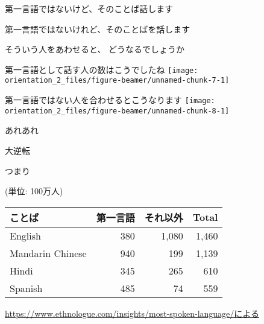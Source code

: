 \documentclass[
  ignorenonframetext,
  aspectratio=169,
  xcolor=dvipsnames]{beamer}
\begin{document}
\begin{frame}{第一言語ではないけど、そのことば話します}
\label{ux7b2cux4e00ux8a00ux8a9eux3067ux306fux306aux3044ux3051ux3069ux305dux306eux3053ux3068ux3070ux8a71ux3057ux307eux3059}
\Large

第一言語ではないけれど、そのことばを話します

そういう人をあわせると、 どうなるでしょうか
\end{frame}

\begin{frame}{第一言語として話す人の数はこうでしたね}
\label{ux7b2cux4e00ux8a00ux8a9eux3068ux3057ux3066ux8a71ux3059ux4ebaux306eux6570ux306fux3053ux3046ux3067ux3057ux305fux306d}
\texttt{[image: orientation\_2\_files/figure-beamer/unnamed-chunk-7-1]}
\end{frame}

\begin{frame}{第一言語ではない人を合わせるとこうなります}
\label{ux7b2cux4e00ux8a00ux8a9eux3067ux306fux306aux3044ux4ebaux3092ux5408ux308fux305bux308bux3068ux3053ux3046ux306aux308aux307eux3059}
\texttt{[image: orientation\_2\_files/figure-beamer/unnamed-chunk-8-1]}
\end{frame}

\begin{frame}{あれあれ}
\label{ux3042ux308cux3042ux308c}
\Huge

大逆転
\end{frame}

\begin{frame}{つまり}
\label{ux3064ux307eux308a}
\raggedleft

(単位: 100万人)

\vfill

\Large

\begin{tabular}{lrrr}
\toprule
ことば & 第一言語 & それ以外 & Total\\
\midrule
English & 380 & 1,080 & 1,460\\
Mandarin Chinese & 940 & 199 & 1,139\\
Hindi & 345 & 265 & 610\\
Spanish & 485 & 74 & 559\\
\bottomrule
\end{tabular}

\vfill

\scriptsize

\url{https://www.ethnologue.com/insights/most-spoken-language/による}
\end{frame}
\end{document}
